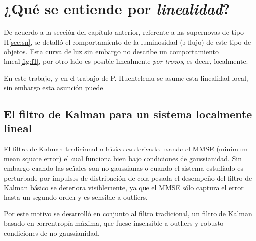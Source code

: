 \chapter{¿Qué se entiende por \textit{linealidad}?}
\label{ch:linear}

De acuerdo a la secci\'on del cap\'itulo anterior, referente a las supernovas de tipo II\ref{sec:sn}, se detall\'o el comportamiento de la luminosidad (o flujo) de este tipo de objetos. Esta curva de luz sin embargo no describe un comportamiento lineal\ref{fig:f1}, por otro lado es posible linealmente \textit{por trozos}, es decir, localmente.
\bigskip

En este trabajo, y en el trabajo de P. Huentelemu\cite{huentelemu} se asume esta linealidad local, sin embargo esta asunci\'on puede  

\section{El filtro de Kalman para un sistema localmente lineal} 
El filtro de Kalman tradicional o b\'asico es derivado usando el MMSE (minimum mean square error) el cual funciona bien bajo condiciones de gaussianidad. Sin embargo cuando las se\~nales son no-gaussianas o cuando el sistema estudiado es perturbado por impulsos de distribuci\'on de cola pesada el desempe\~no del filtro de Kalman b\'asico se deteriora visiblemente, ya que el MMSE s\'olo captura el error hasta un segundo orden y es sensible a outliers\cite{badong}. 
\bigskip

Por este motivo se desarroll\'o en conjunto al filtro tradicional, un filtro de Kalman basado en correntrop\'ia m\'axima, que fuese insensible a outliers y robusto condiciones de no-gaussianidad. 